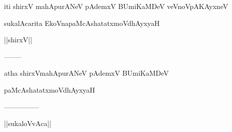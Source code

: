 \documentclass{article}
\begin{document}
\begin{center}
iti shirxV mahApurANeV pAdemxV BUmiKaMDeV veVnoVpAKAyxneV
\end{center}

\begin{center}
sukalAcarita EkoVnapaMcAshatatxmoVdhAyxyaH
\end{center}

\begin{center}
||shirxV||
\end{center}

\begin{center}
--------
\end{center}

\begin{center}
atha shirxVmahApurANeV pAdemxV BUmiKaMDeV
\end{center}

\begin{center}
paMcAshatatxmoVdhAyxyaH
\end{center}

\begin{center}
---------------
\end{center}

\begin{center}
||sukaloVvAca||
\end{center}
\end{document}
